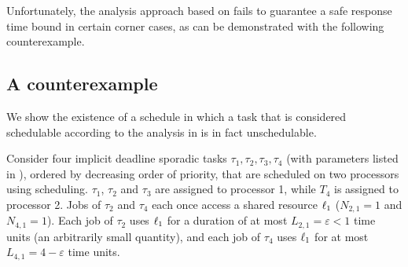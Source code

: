 Unfortunately, the analysis approach based on  fails to guarantee a safe response time bound in certain corner cases, as can be demonstrated with the following counterexample.

\subsection{A counterexample}

We show the existence of a schedule in which a task that is considered schedulable according to the analysis in \cite{lakshmanan-2009} is in fact unschedulable.




Consider four implicit deadline sporadic tasks ${\tau_1, \tau_2, \tau_3, \tau_4}$ (with parameters listed in ), ordered by decreasing order of priority, that are scheduled on two processors using \pfp scheduling. $\tau_1$, $\tau_2$ and $\tau_3$ are assigned to processor 1, while $T_4$ is assigned to processor 2. Jobs of $\tau_2$ and $\tau_4$   each once access a shared resource $\ell_1$  ($N_{2,1} = 1$ and $N_{4,1} = 1$). Each job of $\tau_2$ uses $\ell_1$ for a duration of at most $L_{2,1} = \varepsilon < 1$ time units (an arbitrarily small quantity), and each job of $\tau_4$ uses $\ell_1$ for at most $L_{4,1} = 4-\varepsilon$ time units. 

